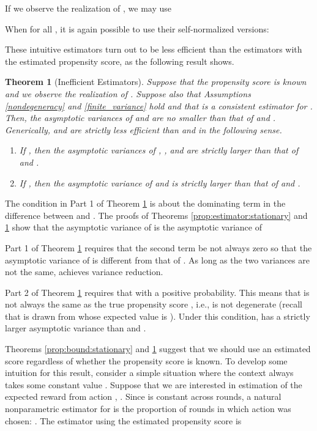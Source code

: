 \documentclass[letterpaper]{article} \usepackage{aaai19}  \usepackage{times}  \usepackage{helvet}  \usepackage{courier}  \usepackage{url}  \usepackage{graphicx}  \frenchspacing  \usepackage{comment}
\newtheorem{theorem}{Theorem}
\begin{document}
If we observe the realization of , we may use

When  for all , it is again possible to use their self-normalized versions: 



These intuitive estimators turn out to be less efficient than the estimators with the estimated propensity score, as the following result shows.

\begin{theorem}[Inefficient Estimators]\label{prop:true_pscore:stationary}
	Suppose that the propensity score  is known and we observe the realization of .
	Suppose also that Assumptions \ref{nondegeneracy} and \ref{finite_variance} hold and that  is a consistent estimator for .
	Then, the asymptotic variances of  and  are no smaller than that of  and . 
	Generically,  and  are strictly less efficient than  and  in the following sense.
	\begin{enumerate}
	\item If , then the asymptotic variances of , ,  and  are strictly larger than that of  and .
	\item If , then the asymptotic variance of  and  is strictly larger than that of  and .
	\end{enumerate}
\end{theorem}

\noindent The condition in Part 1 of Theorem \ref{prop:true_pscore:stationary} is about the dominating term in the difference between  and .
The proofs of Theorems \ref{prop:estimator:stationary} and \ref{prop:true_pscore:stationary} show that the asymptotic variance of  is the asymptotic variance of

Part 1 of Theorem \ref{prop:true_pscore:stationary} requires that the second term be not always zero so that the asymptotic variance of  is different from that of . As long as the two variances are not the same,  achieves variance reduction.

Part 2 of Theorem \ref{prop:true_pscore:stationary} requires that  with a positive probability.
This means that  is not always the same as the true propensity score , i.e.,  is not degenerate (recall that  is drawn from  whose expected value is ).
Under this condition,  has a strictly larger asymptotic variance than  and .

Theorems \ref{prop:bound:stationary} and \ref{prop:true_pscore:stationary} suggest that we should use an estimated score regardless of whether the propensity score is known. To develop some intuition for this result, consider a simple situation where the context  always takes some constant value .
Suppose that we are interested in estimation of the expected reward from action , .
Since  is constant across rounds, a natural nonparametric estimator for  is the proportion of rounds in which action  was chosen: .
The estimator using the estimated propensity score is
\end{document}
